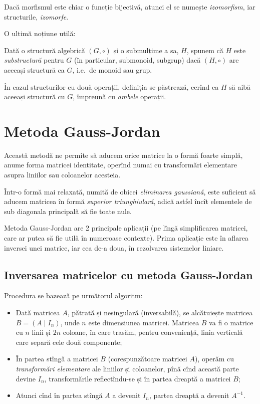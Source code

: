 Dacă morfismul este chiar o funcție bijectivă, atunci el se numește \emph{izomorfism},
iar structurile, \emph{izomorfe}.

O ultimă noțiune utilă:

\begin{definition}\label{def:substruct} 
  Dată o structură algebrică $(G, \circ)$ și o submulțime a sa, $H$, spunem
  că $H$ este \emph{substructură} pentru $G$ (în particular, submonoid,
  subgrup) dacă $(H, \circ)$ are aceeași structură ca $G$, i.e.\ de monoid
  sau grup.
\end{definition}

În cazul structurilor cu două operații, definiția se păstrează, cerînd ca
$H$ să aibă aceeași structură cu $G$, împreună cu \emph{ambele} operații.


\section{Metoda Gauss-Jordan}
Această metodă ne permite să aducem orice matrice la o formă foarte simplă,
anume forma matricei identitate, operînd numai cu transformări elementare
asupra liniilor sau coloanelor acesteia.

Într-o formă mai relaxată, numită de obicei \emph{eliminarea gaussiană}, este suficient
să aducem matricea în formă \emph{superior triunghiulară}, adică astfel încît
elementele de sub diagonala principală să fie toate nule.

Metoda Gauss-Jordan are 2 principale aplicații (pe lîngă simplificarea matricei,
care ar putea să fie utilă în numeroase contexte). Prima aplicație este în aflarea
inversei unei matrice, iar cea de-a doua, în rezolvarea sistemelor liniare.

\subsection{Inversarea matricelor cu metoda Gauss-Jordan}

Procedura se bazează pe următorul algoritm: 
\begin{itemize}
  \item Dată matricea $A$, pătrată și nesingulară (inversabilă), se alcătuiește
    matricea $B = (A \mid I_n)$, unde $n$ este dimensiunea matricei. Matricea $B$
    va fi o matrice cu $n$ linii și $2n$ coloane, în care trasăm, pentru conveniență,
    linia verticală care separă cele două componente;
  \item În partea stîngă a matricei $B$ (corespunzătoare matricei $A$), operăm cu
    \emph{transformări elementare} ale liniilor și coloanelor, pînă cînd această parte
    devine $I_n$, transformările reflectîndu-se și în partea dreaptă
    a matricei $B$;
  \item Atunci cînd în partea stîngă $A$ a devenit $I_n$, partea dreaptă a devenit $A^{-1}$.
\end{itemize}

